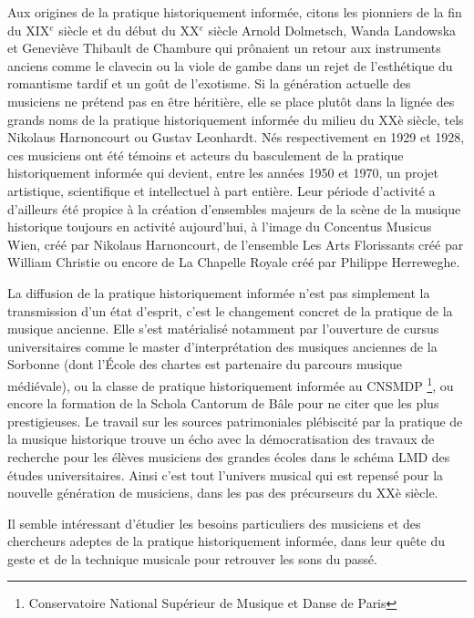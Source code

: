 Aux origines de la pratique historiquement informée, citons les pionniers de la fin du XIX$^{e}$ siècle et du début du XX$^{e}$ siècle Arnold Dolmetsch, Wanda Landowska et Geneviève Thibault de Chambure qui prônaient un retour aux instruments anciens comme le clavecin ou la viole de gambe dans un rejet de l'esthétique du romantisme tardif et un goût de l'exotisme. 
Si la génération actuelle des musiciens ne prétend pas en être héritière, elle se place plutôt dans la lignée des grands noms de la pratique historiquement informée du milieu du XXè siècle, tels Nikolaus Harnoncourt ou Gustav Leonhardt. Nés respectivement en 1929 et 1928, ces musiciens ont été témoins et acteurs du basculement de la pratique historiquement informée qui devient, entre les années 1950 et 1970, un projet artistique, scientifique et intellectuel à part entière. Leur période d'activité a d'ailleurs été propice à la création d'ensembles majeurs de la scène de la musique historique toujours en activité aujourd'hui, à l'image du Concentus Musicus Wien, créé par Nikolaus Harnoncourt, de l'ensemble Les Arts Florissants créé par William Christie ou encore de La Chapelle Royale créé par Philippe Herreweghe.

La diffusion de la pratique historiquement informée n'est pas simplement la transmission d'un état d'esprit, c'est le changement concret de la pratique de la musique ancienne. Elle s'est matérialisé notamment par l'ouverture de cursus universitaires comme le master d'interprétation des musiques anciennes de la Sorbonne (dont l'École des chartes est partenaire du parcours musique médiévale), ou la classe de pratique historiquement informée au CNSMDP \footnote{Conservatoire National Supérieur de Musique et Danse de Paris}, ou encore la formation de la Schola Cantorum de Bâle pour ne citer que les plus prestigieuses. Le travail sur les sources patrimoniales plébiscité par la pratique de la musique historique trouve un écho avec la démocratisation des travaux de recherche pour les élèves musiciens des grandes écoles dans le schéma LMD des études universitaires. Ainsi c'est tout l'univers musical qui est repensé pour la nouvelle génération de musiciens, dans les pas des précurseurs du XXè siècle. 


Il semble intéressant d'étudier les besoins particuliers des musiciens et des chercheurs adeptes de la pratique historiquement informée, dans leur quête du geste et de la technique musicale pour retrouver les sons du passé. 


